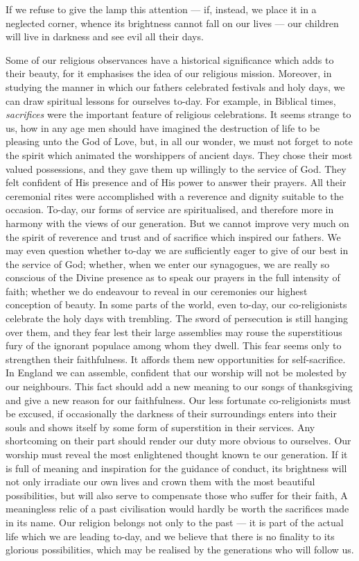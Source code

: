 If we refuse to give the lamp this
attention — if, instead, we place it in a
neglected corner, whence its brightness
cannot fall on our lives — our children will
live in darkness and see evil all their days.

Some of our religious observances have
a historical significance which adds to their
beauty, for it emphasises the idea of our
religious mission. Moreover, in studying the
manner in which our fathers celebrated festivals
and holy days, we can draw spiritual
lessons for ourselves to-day. For example,
in Biblical times, \textsl{sacrifices} were the important
feature of religious celebrations. It seems
strange to us, how in any age men should
have imagined the destruction of life to
be pleasing unto the God of Love, but, in
all our wonder, we must not forget to note
the spirit which animated the worshippers
of ancient days. They chose their most
valued possessions, and they gave them up
willingly to the service of God. They felt
confident of His presence and of His
power to answer their prayers. All their
ceremonial rites were accomplished with a
reverence and dignity suitable to the
occasion. To-day, our forms of service are
spiritualised, and therefore more in harmony
with the views of our generation. But we
cannot improve very much on the spirit of
reverence and trust and of sacrifice which
inspired our fathers. We may even question
whether to-day we are sufficiently eager to
give of our best in the service of God; whether,
when we enter our synagogues, we are really
so conscious of the Divine presence as to
speak our prayers in the full intensity of
faith; whether we do endeavour to reveal
in our ceremonies our highest conception of
beauty. In some parts of the world, even
to-day, our co-religionists celebrate the
holy days with trembling. The sword of
persecution is still hanging over them, and
they fear lest their large assemblies may
rouse the superstitious fury of the ignorant
populace among whom they dwell. This
fear seems only to strengthen their faithfulness.
It affords them new opportunities
for self-sacrifice. In England we can
assemble, confident that our worship will
not be molested by our neighbours. This
fact should add a new meaning to our songs
of thanksgiving and give a new reason for
our faithfulness. Our less fortunate co-religionists
must be excused, if occasionally
the darkness of their surroundings enters
into their souls and shows itself by some
form of superstition in their services. Any
shortcoming on their part should render
our duty more obvious to ourselves. Our
worship must reveal the most enlightened
thought known te our generation. If it is
full of meaning and inspiration for the
guidance of conduct, its brightness will not
only irradiate our own lives and crown
them with the most beautiful possibilities,
but will also serve to compensate those
who suffer for their faith, A meaningless
relic of a past civilisation would hardly be
worth the sacrifices made in its name. Our
religion belongs not only to the past — it
is part of the actual life which we are
leading to-day, and we believe that there is
no finality to its glorious possibilities, which
may be realised by the generations who
will follow us.
